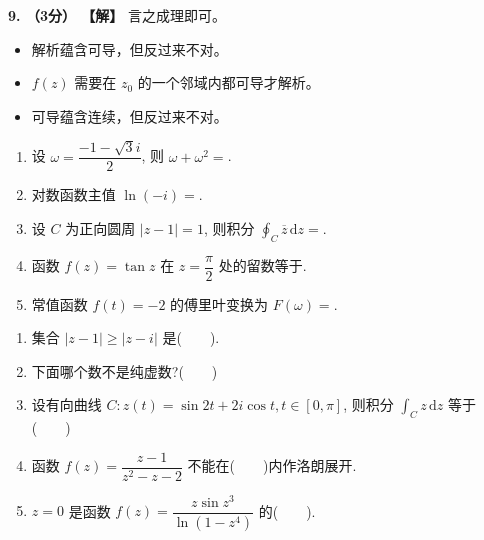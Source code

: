 \documentclass[simple]{hfutexam}
\newcommand{\diff}{\,\mathrm{d}}
\begin{document}
\textbf{9. （3分） 【解】}
言之成理即可。
\begin{itemize}
  \item 解析蕴含可导，但反过来不对。
  \item $f(z)$ 需要在 $z_0$ 的一个邻域内都可导才解析。
  \item 可导蕴含连续，但反过来不对。
\end{itemize}

\ZhuanYeBanJi{}
\maketitle

\begin{enumerate}
\item 设 $\omega=\dfrac{-1-\sqrt3i}2$, 则 $\omega+\omega^2=$\fillblank{}.
\item 对数函数主值 $\ln(-i)=$\fillblank{}.
\item 设 $C$ 为正向圆周 $|z-1|=1$, 则积分 $\displaystyle\oint_{C}\overline z\diff z=$\fillblank{}.
\item 函数 $f(z)=\tan z$ 在 $z=\dfrac\pi2$ 处的留数等于\fillblank{}.
\item 常值函数 $f(t)=-2$ 的傅里叶变换为 $F(\omega)=$\fillblank{}.
\end{enumerate}

\begin{enumerate}
\item 集合 $|z-1|\ge|z-i|$ 是(~~~~).
\item 下面哪个数不是纯虚数?(~~~~)
\item 设有向曲线 $C:z(t)=\sin{2t}+2i\cos{t},t\in[0,\pi]$, 则积分 $\displaystyle\int_C z\diff z$ 等于(~~~~)
\item 函数 $f(z)=\dfrac{z-1}{z^2-z-2}$ 不能在(~~~~)内作洛朗展开.
\item $z=0$ 是函数 $f(z)=\dfrac{z\sin z^3}{\ln(1-z^4)}$ 的(~~~~).
\end{enumerate}
\end{document}
